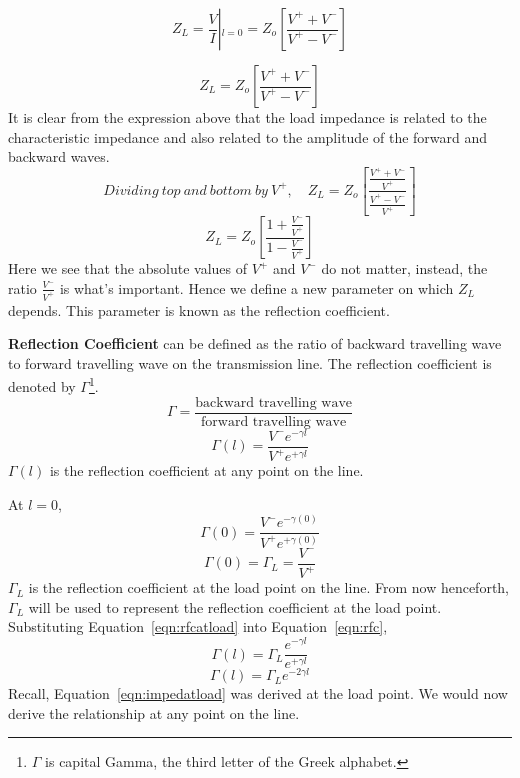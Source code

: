 \begin{equation*}
Z_{L} = \frac{V}{I}\left|_{l = 0} = Z_{o} \left[ \frac{V^+ + V^-}{V^+ - V^-} \right]\right.    
\end{equation*}

\begin{equation}
Z_L = Z_o \left[ \frac{V^+ + V^-}{V^+ - V^-} \right]
\end{equation}
It is clear from the expression above that the load impedance is related to the characteristic impedance and also related to the amplitude of the forward and backward waves. 
\begin{equation*}
Dividing\ top\ and\ bottom\ by\ V^+,\quad
Z_L = Z_o\left[ \frac{\frac{V^+ + V^-}{V^+}}{\frac{V^+ - V^-}{V^+}}\right] 
\end{equation*}
\begin{equation}
Z_L = Z_o\left[ \frac{1+ \frac{V^-}{V^+}}{1 - \frac{V^-}{V^+}}\right] 
\label{eqn:impedatload}
\end{equation}
Here we see that the absolute values of $V^+$ and $V^-$ do not matter, instead, the ratio $\frac{V^-}{V^+}$ is what's important. Hence we define a new parameter on which $Z_L$ depends. This parameter is known as the reflection coefficient.

\textbf{Reflection Coefficient} can be defined as the ratio of backward travelling wave to forward travelling wave on the transmission line.
The reflection coefficient is denoted by $\Gamma$\footnote[3]{$\Gamma$ is capital Gamma, the third letter of the Greek alphabet.}.
\begin{equation*}
\Gamma = \frac{\text{backward travelling wave}}{\text{forward travelling wave}}
\end{equation*}
\begin{equation}
\Gamma (l) = \frac{V^-e^{-\gamma l}}{V^+e^{+\gamma l}}
\label{eqn:rfc}
\end{equation}
$\Gamma(l)$ is the reflection coefficient at any point on the line.

At $l = 0$,
\begin{equation*}
\Gamma (0) = \frac{V^-e^{-\gamma (0)}}{V^+e^{+\gamma (0)}}
\end{equation*}
\begin{equation}
\Gamma (0) = \Gamma_L = \frac{V^-}{V^+}
\label{eqn:rfcatload}
\end{equation}
$\Gamma_L$ is the reflection coefficient at the load point on the line. From now henceforth, $\Gamma_L$ will be used to represent the reflection coefficient at the load point.\\
Substituting Equation~\ref{eqn:rfcatload} into Equation~\ref{eqn:rfc},
\begin{equation*}
\Gamma (l) = \Gamma_L\frac{e^{-\gamma l}}{e^{+\gamma l}}
\end{equation*}
\begin{equation}
\Gamma (l) = \Gamma_L e^{-2\gamma l}
\end{equation}
Recall, Equation~\ref{eqn:impedatload} was derived at the load point. We would now derive the relationship at any point on the line.

